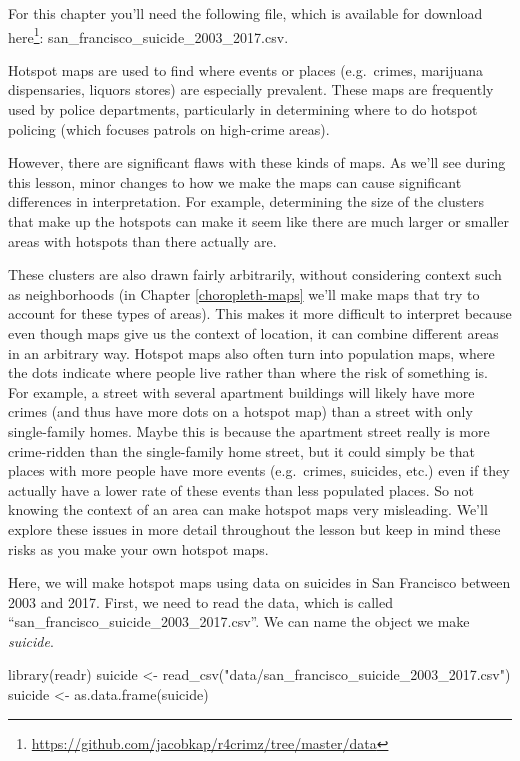 \documentclass[
  a4paper,
]{krantz}
\makeatletter
\newenvironment{Shaded}{\begin{snugshade}}{\end{snugshade}}
\newcommand{\FunctionTok}[1]{\textcolor[rgb]{0,0,0}{#1}}
\newcommand{\NormalTok}[1]{#1}
\newcommand{\OtherTok}[1]{\textcolor[rgb]{0.37,0.37,0.37}{#1}}
\newcommand{\StringTok}[1]{\textcolor[rgb]{0.5,0.5,0.5}{#1}}
\renewcommand{\href}[2]{#2\footnote{\url{#1}}}
\newenvironment{kframe}{%
\medskip{}
\setlength{\fboxsep}{.8em}
 \def\at@end@of@kframe{}%
 \ifinner\ifhmode%
  \def\at@end@of@kframe{\end{minipage}}%
  \begin{minipage}{\columnwidth}%
 \fi\fi%
 \def\FrameCommand##1{\hskip\@totalleftmargin \hskip-\fboxsep
 \colorbox{shadecolor}{##1}\hskip-\fboxsep
     \hskip-\linewidth \hskip-\@totalleftmargin \hskip\columnwidth}%
 \MakeFramed {\advance\hsize-\width
   \@totalleftmargin\z@ \linewidth\hsize
   \@setminipage}}%
 {\par\unskip\endMakeFramed%
 \at@end@of@kframe}
\renewenvironment{Shaded}{\begin{kframe}}{\end{kframe}}
\makeatother
\begin{document}
For this chapter you'll need the following file, which is
available for download
\href{https://github.com/jacobkap/r4crimz/tree/master/data}{here}:
san\_francisco\_suicide\_2003\_2017.csv.

Hotspot maps are used to find where events or places
(e.g.~crimes, marijuana dispensaries, liquors stores) are
especially prevalent. These maps are frequently used by
police departments, particularly in determining where to do
hotspot policing (which focuses patrols on high-crime
areas).

However, there are significant flaws with these kinds of
maps. As we'll see during this lesson, minor changes to how
we make the maps can cause significant differences in
interpretation. For example, determining the size of the
clusters that make up the hotspots can make it seem like
there are much larger or smaller areas with hotspots than
there actually are.

These clusters are also drawn fairly arbitrarily, without
considering context such as neighborhoods (in Chapter
\ref{choropleth-maps} we'll make maps that try to account
for these types of areas). This makes it more difficult to
interpret because even though maps give us the context of
location, it can combine different areas in an arbitrary
way. Hotspot maps also often turn into population maps,
where the dots indicate where people live rather than where
the risk of something is. For example, a street with several
apartment buildings will likely have more crimes (and thus
have more dots on a hotspot map) than a street with only
single-family homes. Maybe this is because the apartment
street really is more crime-ridden than the single-family
home street, but it could simply be that places with more
people have more events (e.g.~crimes, suicides, etc.) even
if they actually have a lower rate of these events than less
populated places. So not knowing the context of an area can
make hotspot maps very misleading. We'll explore these
issues in more detail throughout the lesson but keep in mind
these risks as you make your own hotspot maps.

Here, we will make hotspot maps using data on suicides in
San Francisco between 2003 and 2017. First, we need to read
the data, which is called
``san\_francisco\_suicide\_2003\_2017.csv''. We can name the
object we make \emph{suicide}.

\begin{Shaded}
\begin{Highlighting}[]
\FunctionTok{library}\NormalTok{(readr)}
\NormalTok{suicide }\OtherTok{\textless{}{-}} \FunctionTok{read\_csv}\NormalTok{(}\StringTok{"data/san\_francisco\_suicide\_2003\_2017.csv"}\NormalTok{)}
\NormalTok{suicide }\OtherTok{\textless{}{-}} \FunctionTok{as.data.frame}\NormalTok{(suicide)}
\end{Highlighting}
\end{Shaded}
\end{document}

